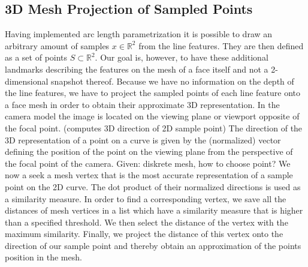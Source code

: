 \subsection{3D Mesh Projection of Sampled Points}
Having implemented arc length parametrization it is possible to draw an arbitrary amount of samples $x \in \mathbb{R}^2$ from the line features. They are then defined as a set of points $S \subset \mathbb{R}^2$. Our goal is, however, to have these additional landmarks describing the features on the mesh of a face itself and not a 2-dimensional snapshot thereof.
Because we have no information on the depth of the line features, we have to project the sampled points of each line feature onto a face mesh in order to obtain their approximate 3D representation. 
In the camera model the image is located on the viewing plane or viewport opposite of the focal point. (computes 3D direction of 2D sample point)
The direction of the 3D representation of a point on a curve is given by the (normalized) vector defining the position of the point on the viewing plane from the perspective of the focal point of the camera.
Given: diskrete mesh, how to choose point?
We now a seek a mesh vertex that is the most accurate representation of a sample point on the 2D curve. The dot product of their normalized directions is used as a similarity measure. In order to find a corresponding vertex, we save all the distances of mesh vertices in a list which have a similarity measure that is higher than a specified threshold. We then select the distance of the vertex with the maximum similarity.
Finally, we project the distance of this vertex onto the direction of our sample point and thereby obtain an approximation of the points position in the mesh.
